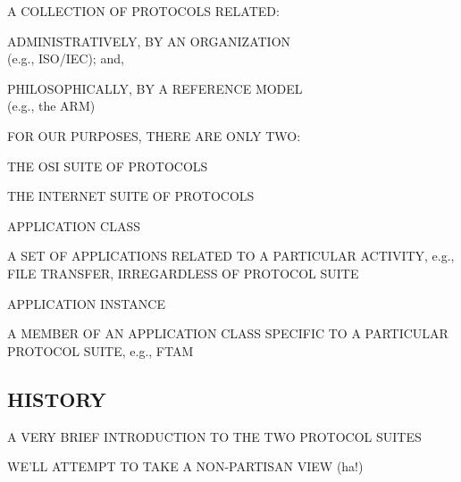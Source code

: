 

\begin{bwslide}

\begin{nrtc}
\item	A COLLECTION OF PROTOCOLS RELATED:
    \begin{nrtc}
    \item	ADMINISTRATIVELY, BY AN ORGANIZATION\\ (e.g., ISO/IEC); and,

    \item	PHILOSOPHICALLY, BY A REFERENCE MODEL\\ (e.g., the ARM)
    \end{nrtc}

\item	FOR OUR PURPOSES, THERE ARE ONLY TWO:
    \begin{nrtc}
    \item	THE OSI SUITE OF PROTOCOLS

    \item	THE INTERNET SUITE OF PROTOCOLS
    \end{nrtc}
\end{nrtc}
\end{bwslide}


\begin{bwslide}

\begin{nrtc}
\item	APPLICATION CLASS
    \begin{nrtc}
    \item	A SET OF APPLICATIONS RELATED TO A PARTICULAR ACTIVITY,
		e.g., FILE TRANSFER, IRREGARDLESS OF PROTOCOL SUITE
    \end{nrtc}

\item	APPLICATION INSTANCE
    \begin{nrtc}
    \item	A MEMBER OF AN APPLICATION CLASS SPECIFIC TO A PARTICULAR
		PROTOCOL SUITE, e.g., FTAM
    \end{nrtc}
\end{nrtc}
\end{bwslide}


\begin{bwslide}
\part*	{HISTORY}\bf

\begin{nrtc}
\item	A VERY BRIEF INTRODUCTION TO THE TWO PROTOCOL SUITES

\item	WE'LL ATTEMPT TO TAKE A NON-PARTISAN VIEW (ha!)
\end{nrtc}
\end{bwslide}


